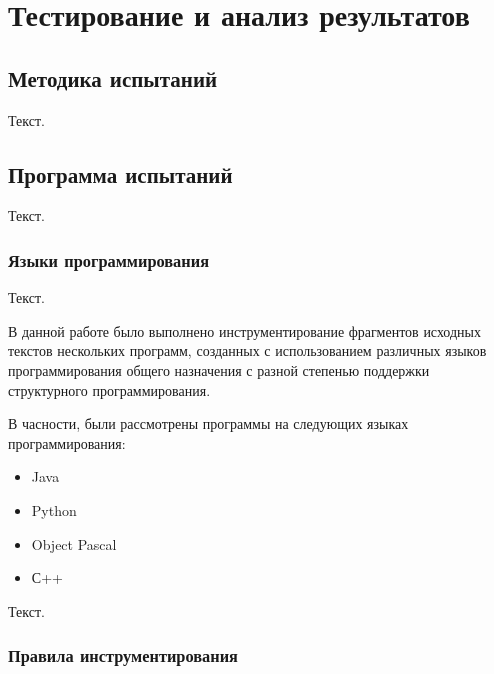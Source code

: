 \chapter{Тестирование и анализ результатов}

\section{Методика испытаний}

Текст.

\section{Программа испытаний}

Текст.

\subsection{Языки программирования}

Текст.

В данной работе было выполнено инструментирование фрагментов исходных текстов нескольких программ, созданных с использованием различных языков программирования общего назначения с разной степенью поддержки структурного программирования.

В часности, были рассмотрены программы на следующих языках программирования:
\begin{itemize}
  \item Java
  \item Python
  \item Object Pascal
  \item С++
\end{itemize}

Текст.

\subsection{Правила инструментирования}

